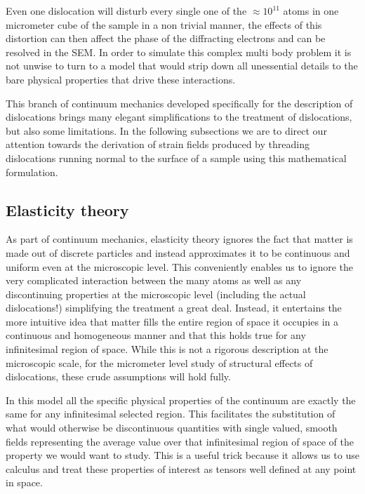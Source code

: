 Even one dislocation will disturb every single one of the $\approx 10^{11}$ atoms in one micrometer cube of the sample in a non trivial manner, the effects of this distortion can then affect the phase of the diffracting electrons and can be resolved in the SEM. In order to simulate this complex multi body problem it is not unwise to turn to a model that would strip down all unessential details to the bare physical properties that drive these interactions.

This branch of continuum mechanics developed specifically for the description of dislocations brings many elegant simplifications to the treatment of dislocations, but also some limitations. In the following subsections we are to direct our attention towards the derivation of strain fields produced by threading dislocations running normal to the surface of a sample using this mathematical formulation.

\subsection{Elasticity theory}
 As part of continuum mechanics, elasticity theory ignores the fact that matter is made out of discrete particles and instead approximates it to be continuous and uniform even at the microscopic level. This conveniently enables us to ignore the very complicated interaction between the many atoms as well as any discontinuing properties at the microscopic level (including the actual dislocations!) simplifying the treatment a great deal. Instead, it entertains the more intuitive idea that matter fills the entire region of space it occupies in a continuous and homogeneous manner and that this holds true for any infinitesimal region of space. While this is not a rigorous description at the microscopic scale, for the micrometer level study of structural effects of dislocations, these crude assumptions will hold fully.

In this model all the specific physical properties of the continuum are exactly the same for
any infinitesimal selected region. This facilitates the substitution of what would otherwise be discontinuous quantities with single valued, smooth fields representing the average value over that infinitesimal region of space of the property we would want to study. This is a useful trick because it allows us to use calculus and treat these properties of interest as tensors well defined at any point in space.

